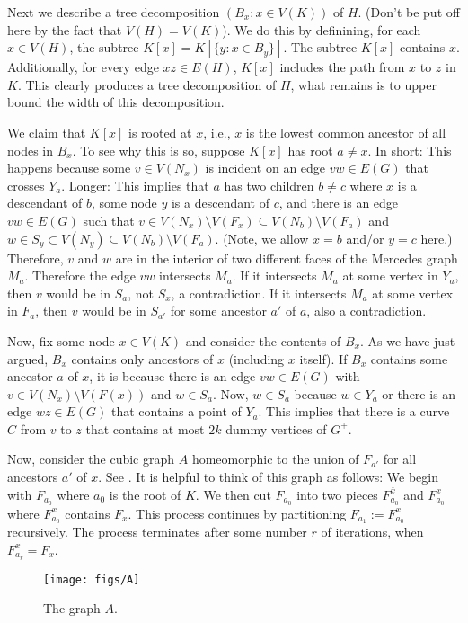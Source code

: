 \documentclass{patmorin}
\begin{document}
Next we describe a tree decomposition $(B_x:x\in V(K))$ of $H$.  (Don't be put off here by the fact that $V(H)=V(K)$).  We do this by definining, for each $x\in V(H)$, the subtree $K[x]=K[\{y:x\in B_y\}]$.  The subtree $K[x]$ contains $x$.  Additionally, for every edge $xz\in E(H)$, $K[x]$ includes the path from $x$ to $z$ in $K$.  This clearly produces a tree decomposition of $H$, what remains is to upper bound the width of this decomposition.

We claim that $K[x]$ is rooted at $x$, i.e., $x$ is the lowest common ancestor of all nodes in $B_x$.  To see why this is so, suppose $K[x]$ has root $a\neq x$.  In short: This happens because some $v\in V(N_x)$ is incident on an edge $vw\in E(G)$ that crosses $Y_a$.  Longer: This implies that $a$ has two children $b\neq c$ where $x$ is a descendant of $b$, some node $y$ is a descendant of $c$, and there is an edge $vw\in E(G)$ such that $v\in V(N_x)\setminus V(F_x)\subseteq V(N_b)\setminus V(F_a)$
and $w\in S_y\subset V(N_y)\subseteq V(N_b)\setminus V(F_a)$.  (Note, we allow $x=b$ and/or $y=c$ here.)  Therefore, $v$ and $w$ are in the interior of two different faces of the Mercedes graph $M_a$.  Therefore the edge $vw$ intersects $M_a$.  If it intersects $M_a$ at some vertex in $Y_a$, then $v$ would be in $S_a$, not $S_x$, a contradiction.  If it intersects $M_a$ at some vertex in $F_a$, then $v$ would be in $S_{a'}$ for some ancestor $a'$ of $a$, also a contradiction.

Now, fix some node $x\in V(K)$ and consider the contents of $B_x$.  As we have just argued, $B_x$ contains only ancestors of $x$ (including $x$ itself). If $B_x$ contains some ancestor $a$ of $x$, it is because there is an edge $vw\in E(G)$ with $v\in V(N_x)\setminus V(F(x))$ and $w\in S_a$.  Now, $w\in S_a$ because $w\in Y_a$ or there is an edge $wz\in E(G)$ that contains a point of $Y_a$.  This implies that there is a curve $C$ from $v$ to $z$ that contains at most $2k$ dummy  vertices of $G^+$.

Now, consider the cubic graph $A$ homeomorphic to the union of $F_{a'}$ for all ancestors $a'$ of $x$. See .  It is helpful to think of this graph as follows:  We begin with $F_{a_0}$ where $a_0$ is the root of $K$.  We then cut $F_{a_0}$ into two pieces $F^{\bar{x}}_{a_0}$ and $F^x_{a_0}$ where $F^x_{a_0}$ contains $F_x$.  This process continues by partitioning $F_{a_1}:=F^x_{a_0}$ recursively.  The process terminates after some number $r$ of iterations, when $F^x_{a_r}=F_x$.

\begin{figure}
  \begin{center}
    \texttt{[image: figs/A]}
  \end{center}
  \caption{The graph $A$.}
\end{figure}
\end{document}

